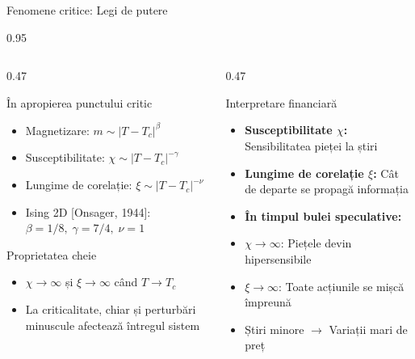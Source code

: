 \documentclass[9pt, aspectratio=169, t]{beamer}
\begin{document}
\begin{frame}{Fenomene critice: Legi de putere}
    \begin{cminipage}{0.95\textwidth}
    {\footnotesize
    \begin{columns}[T]
        \begin{column}{0.47\textwidth}
            \begin{block}{În apropierea punctului critic}
                \begin{itemize}\setlength{\itemsep}{0pt}
                    \item Magnetizare: $m \sim |T - T_c|^{\beta}$
                    \item Susceptibilitate: $\chi \sim |T - T_c|^{-\gamma}$
                    \item Lungime de corelație: $\xi \sim |T - T_c|^{-\nu}$
                    \item Ising 2D [Onsager, 1944]: $\beta = 1/8,\; \gamma = 7/4,\; \nu = 1$
                \end{itemize}
            \end{block}

            \begin{alertblock}{Proprietatea cheie}
                \begin{itemize}\setlength{\itemsep}{0pt}
                    \item $\chi \to \infty$ și $\xi \to \infty$ când $T \to T_c$
                    \item La criticalitate, chiar și perturbări minuscule afectează întregul sistem
                \end{itemize}
            \end{alertblock}
        \end{column}
        \begin{column}{0.47\textwidth}
            \begin{exampleblock}{Interpretare financiară}
                \begin{itemize}\setlength{\itemsep}{0pt}
                    \item \textbf{Susceptibilitate $\chi$:} Sensibilitatea pieței la știri
                    \item \textbf{Lungime de corelație $\xi$:} Cât de departe se propagă informația
                    \item \textbf{În timpul bulei speculative:}
                \end{itemize}
                \begin{itemize}\setlength{\itemsep}{0pt}
                    \item $\chi \to \infty$: Piețele devin hipersensibile
                    \item $\xi \to \infty$: Toate acțiunile se mișcă împreună
                    \item Știri minore $\to$ Variații mari de preț
                \end{itemize}
            \end{exampleblock}


\end{column}
\end{columns}}
\end{cminipage}
\end{frame}
\end{document}
